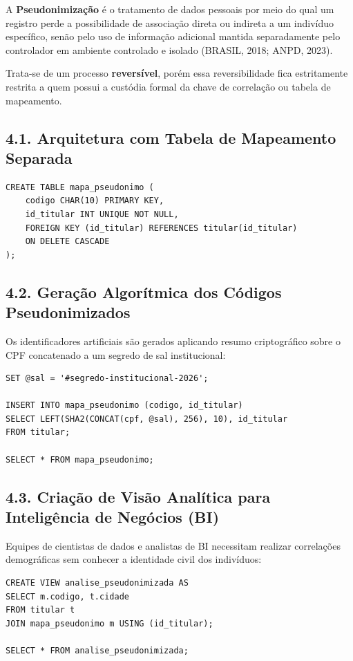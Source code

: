 A \textbf{Pseudonimização} é o tratamento de dados pessoais por meio do qual um registro perde a possibilidade de associação direta ou indireta a um indivíduo específico, senão pelo uso de informação adicional mantida separadamente pelo controlador em ambiente controlado e isolado (BRASIL, 2018; ANPD, 2023).

Trata-se de um processo \textbf{reversível}, porém essa reversibilidade fica estritamente restrita a quem possui a custódia formal da chave de correlação ou tabela de mapeamento.

\subsection*{4.1. Arquitetura com Tabela de Mapeamento Separada}

\begin{lstlisting}
CREATE TABLE mapa_pseudonimo (
    codigo CHAR(10) PRIMARY KEY,
    id_titular INT UNIQUE NOT NULL,
    FOREIGN KEY (id_titular) REFERENCES titular(id_titular)
    ON DELETE CASCADE
);
\end{lstlisting}

\subsection*{4.2. Geração Algorítmica dos Códigos Pseudonimizados}

Os identificadores artificiais são gerados aplicando resumo criptográfico sobre o CPF concatenado a um segredo de sal institucional:

\begin{lstlisting}
SET @sal = '#segredo-institucional-2026';

INSERT INTO mapa_pseudonimo (codigo, id_titular)
SELECT LEFT(SHA2(CONCAT(cpf, @sal), 256), 10), id_titular
FROM titular;

SELECT * FROM mapa_pseudonimo;
\end{lstlisting}

\subsection*{4.3. Criação de Visão Analítica para Inteligência de Negócios (BI)}

Equipes de cientistas de dados e analistas de BI necessitam realizar correlações demográficas sem conhecer a identidade civil dos indivíduos:

\begin{lstlisting}
CREATE VIEW analise_pseudonimizada AS
SELECT m.codigo, t.cidade
FROM titular t
JOIN mapa_pseudonimo m USING (id_titular);

SELECT * FROM analise_pseudonimizada;
\end{lstlisting}

